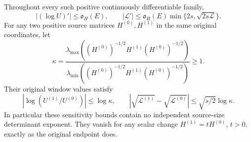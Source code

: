 \begin{theorem}
Throughout every such positive continuously differentiable family,
\[
 \boxed{|(\log U)'|\le\mathfrak o_H(E),\qquad
 |\mathscr L'|\le\mathfrak o_H(E)
             \min\{2s,\sqrt{2s\mathscr L}\}.}                \tag{EW.33}
\]
For any two positive source matrices $H^{(0)},H^{(1)}$ in the
same original coordinates, let
\[
 \kappa=\frac{\lambda_{\max}((H^{(0)})^{-1/2}H^{(1)}(H^{(0)})^{-1/2})}
                   {\lambda_{\min}((H^{(0)})^{-1/2}H^{(1)}(H^{(0)})^{-1/2})}
 \ge1.
                                                               \tag{EW.34}
\]
Their original window values satisfy
\[
 \boxed{|\log(U^{(1)}/U^{(0)})|\le\log\kappa,\qquad
 |\sqrt{\mathscr L^{(1)}}-\sqrt{\mathscr L^{(0)}}|
                  \le\sqrt{s/2}\log\kappa.}                 \tag{EW.35}
\]
In particular these sensitivity bounds contain no independent
source-size determinant exponent. They vanish for any scalar change
$H^{(1)}=tH^{(0)}$, $t>0$, exactly as the original endpoint does.
\end{theorem}
